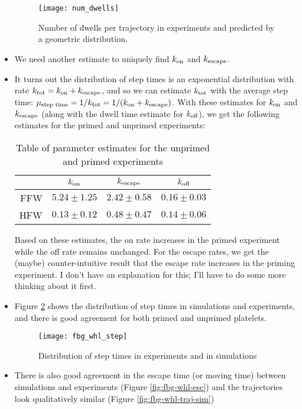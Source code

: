 \documentclass{article}
\newcommand{\tn}{\textnormal}
\begin{document}
\begin{itemize}
  \begin{figure}[h]
    \centering
    \texttt{[image: num\_dwells]}
    \caption{Number of dwells per trajectory in experiments and
      predicted by a geometric distribution.}
    \label{fig:ndwells}
  \end{figure}
\item We need another estimate to uniquely find $k_\tn{on}$ and
  $k_\tn{escape}$.
\item It turns out the distribution of step times is an exponential
  distribution with rate $k_\tn{tot} = k_\tn{on} + k_\tn{escape}$, and
  so we can estimate $k_\tn{tot}$ with the average step time:
  $\mu_\tn{step time} = 1 / k_\tn{tot} = 1 / (k_\tn{on} +
  k_\tn{escape})$. With these estimates for $k_\tn{on}$ and
  $k_\tn{escape}$ (along with the dwell time estimate for
  $k_\tn{off}$), we get the following estimates for the primed and
  unprimed experiments:
  \begin{table}[h]
    \centering
    \begin{tabular}{rccc} \toprule
      & $k_\tn{on}$ & $k_\tn{escape}$ & $k_\tn{off}$ \\ \midrule
      FFW & $5.24 \pm 1.25$ & $2.42 \pm 0.58$ & $0.16 \pm 0.03$ \\
      HFW & $0.13 \pm 0.12$ & $0.48 \pm 0.47$ & $0.14 \pm 0.06$ \\
      \bottomrule 
    \end{tabular}
    \caption{Table of parameter estimates for the unprimed and primed
      experiments}
    \label{tab:par-est}
  \end{table}
  
  Based on these estimates, the on rate increases in the primed
  experiment while the off rate remains unchanged. For the escape
  rates, we get the (maybe) counter-intuitive result that the escape
  rate increases in the priming experiment. I don't have an
  explanation for this; I'll have to do some more thinking about it
  first. 
\item Figure \ref{fig:fbg-whl-step} shows the
  distribution of step times in simulations and experiments, and there
  is good agreement for both primed and unprimed platelets.

  \begin{figure}[h]
    \centering
    \texttt{[image: fbg\_whl\_step]}
    \caption{Distribution of step times in experiments and in
      simulations}
    \label{fig:fbg-whl-step}
  \end{figure}
\item There is also good agreement in the escape time (or moving time)
  between simulations and experiments (Figure \ref{fig:fbg-whl-esc})
  and the trajectories look qualitatively similar (Figure
  \ref{fig:fbg-whl-traj-sim}) 


\end{itemize}
\end{document}
